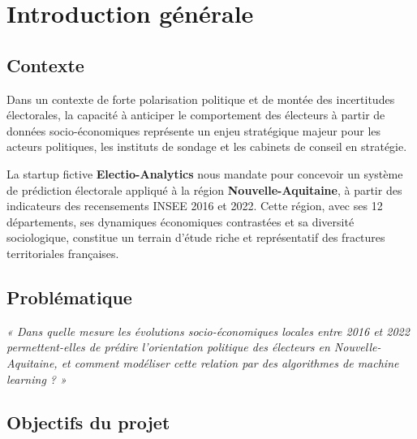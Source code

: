 \chapter*{Introduction générale}

\section*{Contexte}

Dans un contexte de forte polarisation politique et de montée des incertitudes électorales,
la capacité à anticiper le comportement des électeurs à partir de données socio-économiques
représente un enjeu stratégique majeur pour les acteurs politiques, les instituts de sondage
et les cabinets de conseil en stratégie.

La startup fictive \textbf{Electio-Analytics} nous mandate pour concevoir un système de
prédiction électorale appliqué à la région \textbf{Nouvelle-Aquitaine}, à partir des
indicateurs des recensements INSEE 2016 et 2022. Cette région, avec ses 12 départements,
ses dynamiques économiques contrastées et sa diversité sociologique, constitue un terrain
d'étude riche et représentatif des fractures territoriales françaises.

\section*{Problématique}

\begin{center}
\textit{« Dans quelle mesure les évolutions socio-économiques locales entre 2016 et 2022
permettent-elles de prédire l'orientation politique des électeurs en Nouvelle-Aquitaine,
et comment modéliser cette relation par des algorithmes de machine learning ? »}
\end{center}

\section*{Objectifs du projet}

